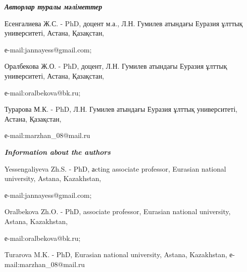 \emph{{\bfseries Авторлар туралы мәліметтер}}

Есенгалиева Ж.С. - PhD, доцент м.а., Л.Н. Гумилев атындағы Еуразия
ұлттық университеті, Астана, Қазақстан,

е-mail:jannayess@gmail.com;

Оралбекова Ж.О. - PhD, доцент, Л.Н. Гумилев атындағы Еуразия ұлттық
университеті, Астана, Қазақстан,

е-mail:oralbekova@bk.ru;

Турарова М.К. - PhD, Л.Н. Гумилев атындағы Еуразия ұлттық университеті,
Астана, Қазақстан,

е-mail:marzhan\_08@mail.ru

\emph{{\bfseries Information about the authors}}

Yessengaliyeva Zh.S. - PhD, аcting associate professor, Eurasian
national university, Astana, Kazakhstan,

е-mail:jannayess@gmail.com;

Oralbekova Zh.O. - PhD, associate professor, Eurasian national
university, Astana, Kazakhstan,

е-mail:oralbekova@bk.ru;

Turarova M.K. - PhD, Eurasian national university, Astana, Kazakhstan,
е-mail:marzhan\_08@mail.ru


